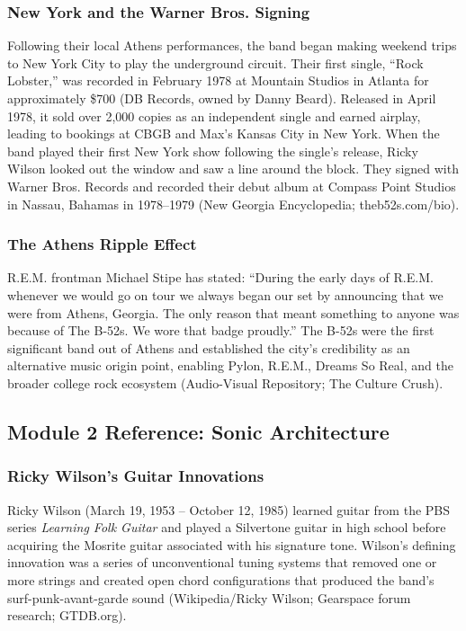 \documentclass[11pt,letterpaper]{article}
\begin{document}
\subsubsection{New York and the Warner Bros. Signing}

Following their local Athens performances, the band began making weekend trips to New York City to play the underground circuit. Their first single, ``Rock Lobster,'' was recorded in February 1978 at Mountain Studios in Atlanta for approximately \$700 (DB Records, owned by Danny Beard). Released in April 1978, it sold over 2,000 copies as an independent single and earned airplay, leading to bookings at CBGB and Max's Kansas City in New York. When the band played their first New York show following the single's release, Ricky Wilson looked out the window and saw a line around the block. They signed with Warner Bros. Records and recorded their debut album at Compass Point Studios in Nassau, Bahamas in 1978--1979 (New Georgia Encyclopedia; theb52s.com/bio).

\subsubsection{The Athens Ripple Effect}

R.E.M. frontman Michael Stipe has stated: ``During the early days of R.E.M. whenever we would go on tour we always began our set by announcing that we were from Athens, Georgia. The only reason that meant something to anyone was because of The B-52s. We wore that badge proudly.'' The B-52s were the first significant band out of Athens and established the city's credibility as an alternative music origin point, enabling Pylon, R.E.M., Dreams So Real, and the broader college rock ecosystem (Audio-Visual Repository; The Culture Crush).

\subsection{Module 2 Reference: Sonic Architecture}

\subsubsection{Ricky Wilson's Guitar Innovations}

Ricky Wilson (March 19, 1953 -- October 12, 1985) learned guitar from the PBS series \textit{Learning Folk Guitar} and played a Silvertone guitar in high school before acquiring the Mosrite guitar associated with his signature tone. Wilson's defining innovation was a series of unconventional tuning systems that removed one or more strings and created open chord configurations that produced the band's surf-punk-avant-garde sound (Wikipedia/Ricky Wilson; Gearspace forum research; GTDB.org).
\end{document}
